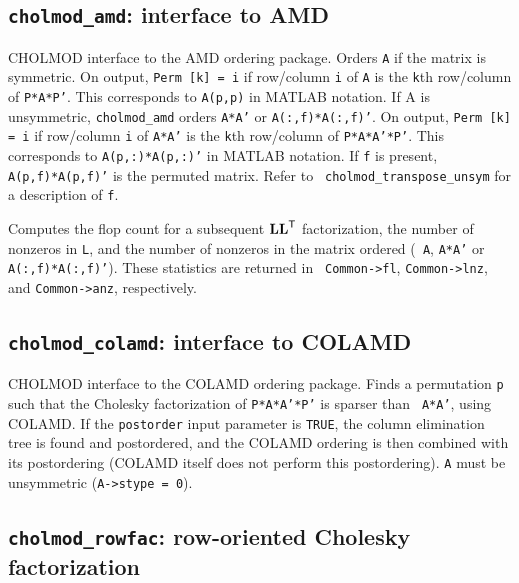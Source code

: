 \documentclass[11pt]{article}
\newcommand{\m}[1]{{\bf{#1}}}       %
\newcommand{\tr}{^{\sf T}}          %
\begin{document}
\subsection{{\tt cholmod\_amd}: interface to AMD}


CHOLMOD interface to the AMD ordering package.  Orders {\tt A} if the matrix is
symmetric.  On output, {\tt Perm [k] = i} if row/column {\tt i} of {\tt A} is
the {\tt k}th row/column of {\tt P*A*P'}.  This corresponds to {\tt A(p,p)} in
MATLAB notation.  If A is unsymmetric, {\tt cholmod\_amd} orders {\tt A*A'} or
{\tt A(:,f)*A(:,f)'}.  On output, {\tt Perm [k] = i} if row/column {\tt i} of
{\tt A*A'} is the {\tt k}th row/column of {\tt P*A*A'*P'}.  This corresponds to
{\tt A(p,:)*A(p,:)'} in MATLAB notation.  If {\tt f} is present, {\tt
A(p,f)*A(p,f)'} is the permuted matrix.  Refer to {\tt
cholmod\_transpose\_unsym} for a description of {\tt f}.

Computes the flop count for a subsequent $\m{LL}\tr$ factorization, the number
of nonzeros in {\tt L}, and the number of nonzeros in the matrix ordered ({\tt
A}, {\tt A*A'} or {\tt A(:,f)*A(:,f)'}).  These statistics are returned in {\tt
Common->fl}, {\tt Common->lnz}, and {\tt Common->anz}, respectively.

\subsection{{\tt cholmod\_colamd}: interface to COLAMD}


CHOLMOD interface to the COLAMD ordering package.  Finds a permutation {\tt p}
such that the Cholesky factorization of {\tt P*A*A'*P'} is sparser than {\tt
A*A'}, using COLAMD.  If the {\tt postorder} input parameter is {\tt TRUE}, the
column elimination tree is found and postordered, and the COLAMD ordering is
then combined with its postordering (COLAMD itself does not perform this
postordering).  {\tt A} must be unsymmetric ({\tt A->stype = 0}).

\subsection{{\tt cholmod\_rowfac}: row-oriented Cholesky factorization}
\end{document}

